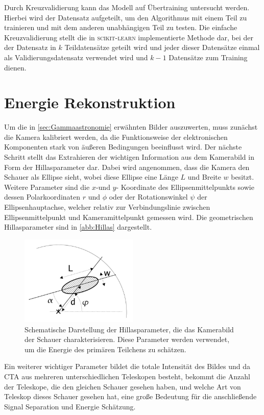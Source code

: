 Durch Kreuzvalidierung kann das Modell auf Übertraining untersucht werden. Hierbei wird der Datensatz aufgeteilt, um
den Algorithmus mit einem Teil zu trainieren und mit dem anderen unabhängigen Teil zu testen.
Die einfache Kreuzvalidierung stellt die in \textsc{scikit-learn} implementierte Methode dar, bei der der Datensatz
in $k$ Teildatensätze geteilt wird und jeder dieser Datensätze einmal als Validierungsdatensatz
verwendet wird und $k-1$ Datensätze zum Training dienen.

\section{Energie Rekonstruktion}

Um die in \autoref{sec:Gammaastronomie} erwähnten Bilder auszuwerten, muss zunächst die Kamera kalibriert werden, da die Funktionsweise der elektronischen
Komponenten stark von äußeren Bedingungen beeinflusst wird.
Der nächste Schritt stellt das Extrahieren der wichtigen Information aus dem Kamerabild in Form der Hillasparameter dar.
Dabei wird angenommen, dass die Kamera den Schauer als Ellipse sieht, wobei diese Ellipse eine Länge $L$ und Breite $w$ besitzt.
Weitere Parameter sind die $x$-und $y$- Koordinate des Ellipsenmittelpunkts sowie dessen Polarkoordinaten $r$ und $\phi$ oder der Rotationswinkel $\psi$
der Ellipsenhauptachse, welcher relativ zur Verbindungslinie zwischen Ellipsenmittelpunkt und Kameramittelpunkt gemessen wird.
Die geometrischen Hillasparameter sind in \autoref{abb:Hillas} dargestellt.
\begin{figure}
  \includegraphics[width=0.5\textwidth]{Plots/Hillas.JPG}
  \centering
  \caption{Schematische Darstellung der Hillasparameter, die das Kamerabild der Schauer charakterisieren. Diese Parameter
            werden verwendet, um die Energie des primären Teilchens zu schätzen.~\cite[101]{HESS}}
  \label{abb:Hillas}
\end{figure}
Ein weiterer wichtiger Parameter bildet die totale Intensität des Bildes und da CTA aus mehreren unterschiedlichen Teleskopen besteht, bekommt die Anzahl
der Teleskope, die den gleichen Schauer gesehen haben, und welche Art von Teleskop dieses Schauer gesehen hat, eine große Bedeutung für die anschließende
Signal Separation und Energie Schätzung.

